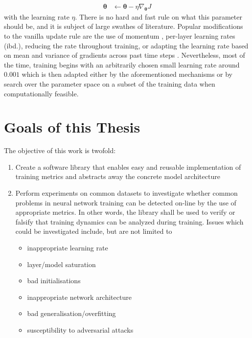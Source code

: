 \begin{align}
    \boldsymbol\theta &\leftarrow \boldsymbol\theta - \eta \nabla_{\boldsymbol\theta}J
\end{align}
with the learning rate $\eta$. There is no hard and fast rule on what this
parameter should be, and it is subject of large swathes of literature. Popular
modifications to the vanilla update rule are the use of momentum
\citep{jacobs1988increased}, per-layer learning rates (ibd.), reducing the rate
throughout training, or adapting the
learning rate based on mean and variance of gradients across past time steps
\citep{kingma2014adam}. Nevertheless, most of the time, training begins with an
arbitrarily chosen small learning rate around $0.001$ which is then adapted
either by the aforementioned mechanisms or by search over the parameter space on
a subset of the training data when computationally feasible.


\hypertarget{sec:thesis-goals}{%
\section{Goals of this Thesis}\label{sec:thesis-goals}}

The objective of this work is twofold:

\begin{enumerate}
    \item
        Create a software library that enables easy and reusable
        implementation of training metrics and abstracts away the concrete model
        architecture
    \item
        Perform experiments on common datasets to investigate whether common
        problems in neural network training can be detected on-line by the use of
        appropriate metrics. In other words, the library shall be used to
        verify or falsify that training dynamics can be analyzed during
        training. Issues which could be investigated include, but are
        not limited to
        \begin{itemize}
            \item
                inappropriate learning rate
            \item
                layer/model saturation
            \item
                bad initialisations
            \item
                inappropriate network architecture
            \item
                bad generalisation/overfitting
            \item
                susceptibility to adversarial attacks
        \end{itemize}
\end{enumerate}

